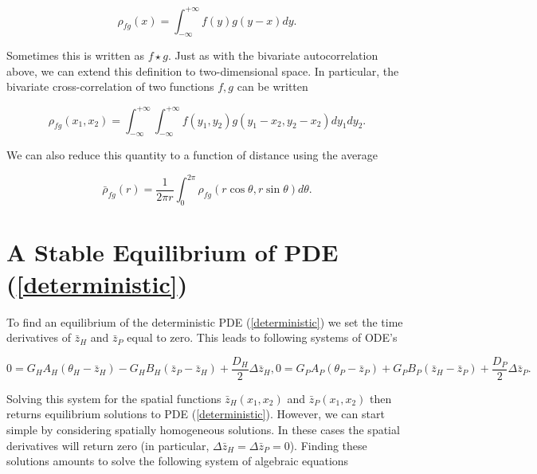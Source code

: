 \documentclass{article}
\begin{document}
\begin{equation}
  \rho_{fg}(x)=\int_{-\infty}^{+\infty}f(y)g(y-x)dy.
\end{equation}

Sometimes this is written as \(f\star g\). Just as with the bivariate
autocorrelation above, we can extend this definition to two-dimensional
space. In particular, the bivariate cross-correlation of two functions
\(f,g\) can be written

\begin{equation}
  \rho_{fg}(x_1,x_2)=\int_{-\infty}^{+\infty}\int_{-\infty}^{+\infty}f(y_1,y_2)g(y_1-x_2,y_2-x_2)dy_1dy_2.
\end{equation}

We can also reduce this quantity to a function of distance using the
average

\begin{equation}
  \bar\rho_{fg}(r)=\frac{1}{2\pi r}\int_0^{2\pi}\rho_{fg}(r\cos\theta,r\sin\theta)d\theta.
\end{equation}

\hypertarget{a-stable-equilibrium-of-pde}{%
\section{\texorpdfstring{A Stable Equilibrium of PDE
(\ref{deterministic})}{A Stable Equilibrium of PDE ()}}\label{a-stable-equilibrium-of-pde}}

To find an equilibrium of the deterministic PDE (\ref{deterministic}) we
set the time derivatives of \(\bar z_H\) and \(\bar z_P\) equal to zero.
This leads to following systems of ODE's

\begin{subequations}
  \begin{equation}
    0=G_HA_H(\theta_H-\bar z_H)-G_HB_H(\bar z_P-\bar z_H)+\frac{D_H}{2}\Delta\bar z_H,
  \end{equation}
  \begin{equation}
    0=G_PA_P(\theta_P-\bar z_P)+G_PB_P(\bar z_H-\bar z_P)+\frac{D_P}{2}\Delta\bar z_P.
  \end{equation}
\end{subequations}

Solving this system for the spatial functions \(\bar z_H(x_1,x_2)\) and
\(\bar z_P(x_1,x_2)\) then returns equilibrium solutions to PDE
(\ref{deterministic}). However, we can start simple by considering
spatially homogeneous solutions. In these cases the spatial derivatives
will return zero (in particular, \(\Delta\bar z_H=\Delta\bar z_P=0\)).
Finding these solutions amounts to solve the following system of
algebraic equations
\end{document}
